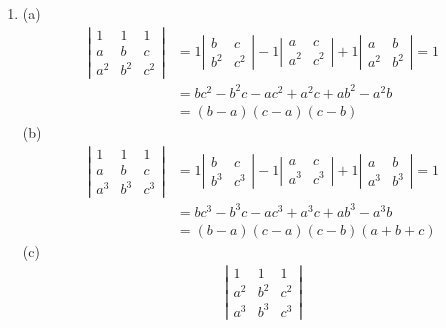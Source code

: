 \documentclass[a4paper, 12pt]{article}
\begin{document}
\begin{enumerate}
		\item (a)
		\begin{align*}
		\left| \begin{array}{ccc}
		1 & 1 & 1 \\
		a & b & c \\
		a^2 & b^2 & c^2
		\end{array} \right|
		&= 1 \left| \begin{array}{cc}
		b & c \\
		b^2 & c^2
		\end{array} \right|
		- 1 \left| \begin{array}{cc}
		a & c \\
		a^2 & c^2
		\end{array} \right|
		+ 1 \left| \begin{array}{cc}
		a & b \\
		a^2 & b^2
		\end{array} \right|
		= 1 \\
		&= bc^2 - b^2c - ac^2 + a^2c + ab^2 - a^2b \\
		&= (b - a)(c - a)(c - b)
		\end{align*}
		(b)
		\begin{align*}
		\left| \begin{array}{ccc}
		1 & 1 & 1 \\
		a & b & c \\
		a^3 & b^3 & c^3
		\end{array} \right|
		&= 1 \left| \begin{array}{cc}
		b & c \\
		b^3 & c^3
		\end{array} \right|
		- 1 \left| \begin{array}{cc}
		a & c \\
		a^3 & c^3
		\end{array} \right|
		+ 1 \left| \begin{array}{cc}
		a & b \\
		a^3 & b^3
		\end{array} \right|
		= 1 \\
		&= bc^3 - b^3c - ac^3 + a^3c + ab^3 - a^3b \\
		&= (b - a)(c - a)(c - b)(a + b + c)
		\end{align*}
		(c)
		\begin{align*}
		\left| \begin{array}{ccc}
		1 & 1 & 1 \\
		a^2 & b^2 & c^2 \\
		a^3 & b^3 & c^3
		\end{array} \right|

\end{align*}
\end{enumerate}
\end{document}
